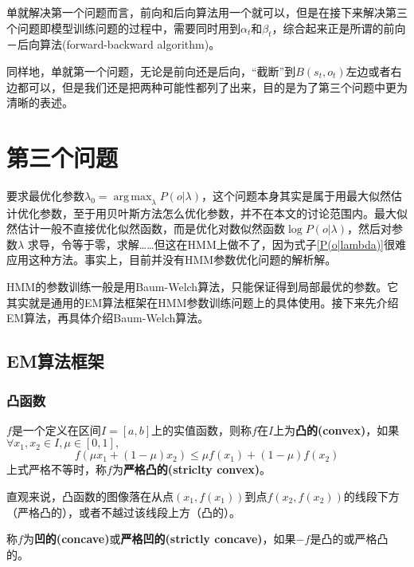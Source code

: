 \documentclass[11pt,a4paper]{article}
\DeclareMathOperator*{\argmax}{arg\,max}
\numberwithin{equation}{section}
\begin{document}
单就解决第一个问题而言，前向和后向算法用一个就可以，但是在接下来解决第三个问题即模型训练问题的过程中，需要同时用到$ \alpha_t $和$ \beta_t $，综合起来正是所谓的前向－后向算法(forward-backward algorithm)。

同样地，单就第一个问题，无论是前向还是后向，“截断”到$ B(s_t, o_t) $左边或者右边都可以，但是我们还是把两种可能性都列了出来，目的是为了第三个问题中更为清晰的表述。

\section{第三个问题}

要求最优化参数$ \lambda_0 = \argmax_{\lambda} P(o | \lambda) $，这个问题本身其实是属于用最大似然估计优化参数，至于用贝叶斯方法怎么优化参数，并不在本文的讨论范围内。最大似然估计一般不直接优化似然函数，而是优化对数似然函数$ \log P(o | \lambda) $，然后对参数$ \lambda $	求导，令等于零，求解……但这在HMM上做不了，因为式子\eqref{P(o|lambda)}很难应用这种方法。事实上，目前并没有HMM参数优化问题的解析解。

HMM的参数训练一般是用Baum-Welch算法，只能保证得到局部最优的参数。它其实就是通用的EM算法框架在HMM参数训练问题上的具体使用。接下来先介绍EM算法，再具体介绍Baum-Welch算法。

\subsection{EM算法框架}

\subsubsection{凸函数}

\begin{definition}\label{convex definition}
$ f $是一个定义在区间$ I = [a, b] $上的实值函数，则称$ f $在$ I $上为\textbf{凸的(convex)}，如果$ \forall x_1, x_2 \in I, \mu \in [0, 1], $
\begin{equation*}
f(\mu x_1 + (1 - \mu) x_2) \le \mu f(x_1) + (1 - \mu) f(x_2)
\end{equation*}
上式严格不等时，称$ f $为\textbf{严格凸的(striclty convex)}。
\end{definition}

直观来说，凸函数的图像落在从点$ (x_1, f(x_1)) $到点$ f(x_2, f(x_2)) $的线段下方（严格凸的），或者不越过该线段上方（凸的）。

\begin{definition}\label{concave definition}
称$ f $为\textbf{凹的(concave)}或\textbf{严格凹的(strictly concave)}，如果$ -f $是凸的或严格凸的。
\end{definition}
\end{document}
